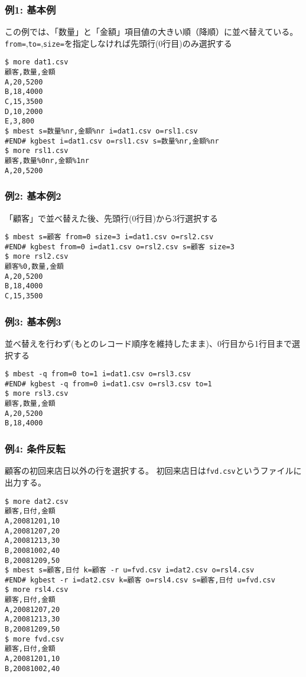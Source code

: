 \subsubsection*{例1: 基本例}

この例では、「数量」と「金額」項目値の大きい順（降順）に並べ替えている。
\verb|from=|,\verb|to=|,\verb|size=|を指定しなければ先頭行(0行目)のみ選択する


\begin{Verbatim}[baselinestretch=0.7,frame=single]
$ more dat1.csv
顧客,数量,金額
A,20,5200 
B,18,4000   
C,15,3500 
D,10,2000 
E,3,800 
$ mbest s=数量%nr,金額%nr i=dat1.csv o=rsl1.csv
#END# kgbest i=dat1.csv o=rsl1.csv s=数量%nr,金額%nr
$ more rsl1.csv
顧客,数量%0nr,金額%1nr
A,20,5200 
\end{Verbatim}
\subsubsection*{例2: 基本例2}

「顧客」で並べ替えた後、先頭行(0行目)から3行選択する


\begin{Verbatim}[baselinestretch=0.7,frame=single]
$ mbest s=顧客 from=0 size=3 i=dat1.csv o=rsl2.csv
#END# kgbest from=0 i=dat1.csv o=rsl2.csv s=顧客 size=3
$ more rsl2.csv
顧客%0,数量,金額
A,20,5200 
B,18,4000   
C,15,3500 
\end{Verbatim}
\subsubsection*{例3: 基本例3}

並べ替えを行わず(もとのレコード順序を維持したまま)、0行目から1行目まで選択する


\begin{Verbatim}[baselinestretch=0.7,frame=single]
$ mbest -q from=0 to=1 i=dat1.csv o=rsl3.csv
#END# kgbest -q from=0 i=dat1.csv o=rsl3.csv to=1
$ more rsl3.csv
顧客,数量,金額
A,20,5200 
B,18,4000   
\end{Verbatim}
\subsubsection*{例4: 条件反転}

顧客の初回来店日以外の行を選択する。
初回来店日は\verb|fvd.csv|というファイルに出力する。


\begin{Verbatim}[baselinestretch=0.7,frame=single]
$ more dat2.csv
顧客,日付,金額
A,20081201,10
A,20081207,20
A,20081213,30
B,20081002,40
B,20081209,50
$ mbest s=顧客,日付 k=顧客 -r u=fvd.csv i=dat2.csv o=rsl4.csv
#END# kgbest -r i=dat2.csv k=顧客 o=rsl4.csv s=顧客,日付 u=fvd.csv
$ more rsl4.csv
顧客,日付,金額
A,20081207,20
A,20081213,30
B,20081209,50
$ more fvd.csv
顧客,日付,金額
A,20081201,10
B,20081002,40
\end{Verbatim}
